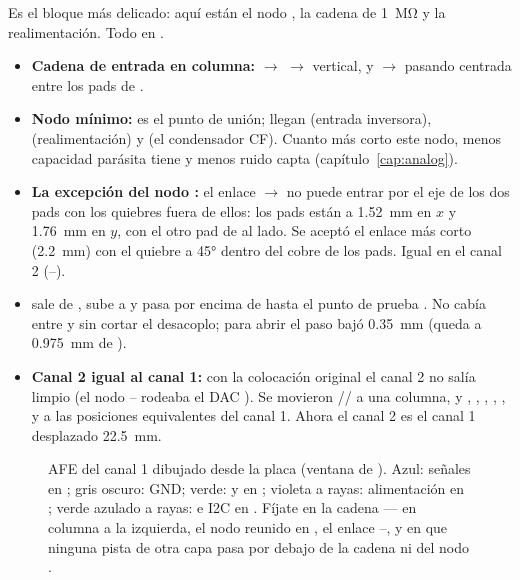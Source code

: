 Es el bloque más delicado: aquí están el nodo , la cadena de \SI{1}{\mega\ohm} y la realimentación. Todo en
.
\begin{itemize}
  \item \textbf{Cadena de entrada en columna:}  $\to$  $\to$  vertical, y 
  $\to$  pasando centrada entre los pads de .
  \item \textbf{Nodo  mínimo:}  es el punto de unión; llegan  (entrada inversora),
   (realimentación) y  (el condensador CF). Cuanto más corto este nodo, menos capacidad parásita
  tiene y menos ruido capta (capítulo~\ref{cap:analog}).
  \item \textbf{La excepción del nodo :} el enlace  $\to$  no puede entrar por el eje de
  los dos pads con los quiebres fuera de ellos: los pads están a \SI{1.52}{\milli\meter} en $x$ y
  \SI{1.76}{\milli\meter} en $y$, con el otro pad de  al lado. Se aceptó el enlace más corto
  (\SI{2.2}{\milli\meter}) con el quiebre a \ang{45} dentro del cobre de los pads. Igual en el canal 2
  (--).
  \item \textbf{} sale de , sube a  y pasa por encima de  hasta el punto de
  prueba . No cabía entre  y  sin cortar el desacoplo; para abrir el paso  bajó
  \SI{0.35}{\milli\meter} (queda a \SI{0.975}{\milli\meter} de ).
  \item \textbf{Canal 2 igual al canal 1:} con la colocación original el canal 2 no salía limpio (el nodo
  -- rodeaba el DAC ). Se movieron // a una columna, y ,
  , , , ,  y  a las posiciones equivalentes del canal 1. Ahora el
  canal 2 es el canal 1 desplazado \SI{22.5}{\milli\meter}.
\end{itemize}

\begin{figure}[htbp]
\centering

\caption{AFE del canal 1 dibujado desde la placa (ventana de ). Azul: señales en
; gris oscuro: GND; verde:  y  en ; violeta a rayas: alimentación en ; verde azulado a
rayas:  e I2C en . Fíjate en la cadena ---- en columna a la
izquierda, el nodo  reunido en , el enlace --, y en que ninguna pista de otra
capa pasa por debajo de la cadena ni del nodo .}
\label{fig:c09-afe}
\end{figure}

